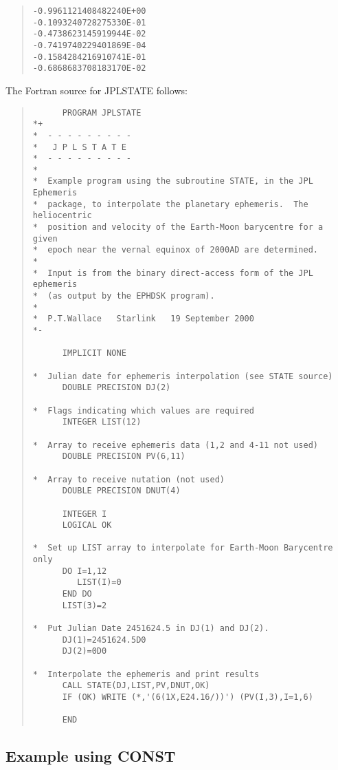 \documentclass[twoside,11pt]{article}
\newcommand{\xlabel}[1]{}
\renewcommand{\_}{\texttt{\symbol{95}}}
\newcommand{\latexonlysmall}{\small}
\newcommand{\latexonlysmall}{}
\begin{document}
\begin{quote}
\begin{verbatim}
-0.9961121408482240E+00
-0.1093240728275330E-01
-0.4738623145919944E-02
-0.7419740229401869E-04
-0.1584284216910741E-01
-0.6868683708183170E-02
\end{verbatim}
\end{quote}

The Fortran source for JPLSTATE follows:

\begin{quote}
\latexonlysmall
\begin{verbatim}
      PROGRAM JPLSTATE
*+
*  - - - - - - - - -
*   J P L S T A T E
*  - - - - - - - - -
*
*  Example program using the subroutine STATE, in the JPL Ephemeris
*  package, to interpolate the planetary ephemeris.  The heliocentric 
*  position and velocity of the Earth-Moon barycentre for a given 
*  epoch near the vernal equinox of 2000AD are determined.
*
*  Input is from the binary direct-access form of the JPL ephemeris
*  (as output by the EPHDSK program).
*
*  P.T.Wallace   Starlink   19 September 2000
*-

      IMPLICIT NONE

*  Julian date for ephemeris interpolation (see STATE source)
      DOUBLE PRECISION DJ(2)

*  Flags indicating which values are required
      INTEGER LIST(12)

*  Array to receive ephemeris data (1,2 and 4-11 not used)
      DOUBLE PRECISION PV(6,11)

*  Array to receive nutation (not used)
      DOUBLE PRECISION DNUT(4)

      INTEGER I
      LOGICAL OK

*  Set up LIST array to interpolate for Earth-Moon Barycentre only
      DO I=1,12
         LIST(I)=0
      END DO
      LIST(3)=2

*  Put Julian Date 2451624.5 in DJ(1) and DJ(2).
      DJ(1)=2451624.5D0
      DJ(2)=0D0

*  Interpolate the ephemeris and print results
      CALL STATE(DJ,LIST,PV,DNUT,OK)
      IF (OK) WRITE (*,'(6(1X,E24.16/))') (PV(I,3),I=1,6)

      END

\end{verbatim}
\end{quote}

\subsection{\xlabel{example_using_const}Example using CONST}
\label{example_using_const}
\end{document}
